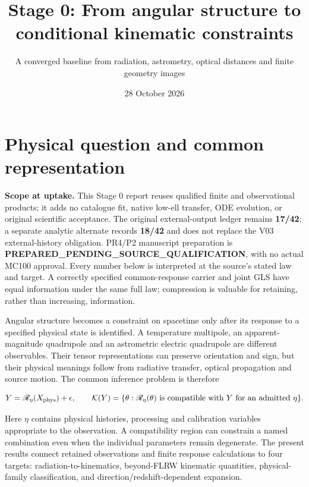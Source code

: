 \documentclass[
  10pt,
]{article}
\title{Stage 0: From angular structure to conditional kinematic
constraints}
\subtitle{A converged baseline from radiation, astrometry, optical
distances and finite geometry images}
\author{}
\date{28 October 2026}
\begin{document}
\maketitle

\hypertarget{physical-question-and-common-representation}{%
\section{Physical question and common
representation}\label{physical-question-and-common-representation}}

\textbf{Scope at uptake.} This Stage 0 report reuses qualified finite
and observational products; it adds no catalogue fit, native low-ell
transfer, ODE evolution, or original scientific acceptance. The original
external-output ledger remains \textbf{17/42}; a separate analytic
alternate records \textbf{18/42} and does not replace the V03
external-history obligation. PR4/P2 manuscript preparation is
\textbf{PREPARED\_PENDING\_SOURCE\_QUALIFICATION}, with no actual MC100
approval. Every number below is interpreted at the source's stated law
and target. A correctly specified common-response carrier and joint GLS
have equal information under the same full law; compression is valuable
for retaining, rather than increasing, information.

Angular structure becomes a constraint on spacetime only after its
response to a specified physical state is identified. A temperature
multipole, an apparent-magnitude quadrupole and an astrometric electric
quadrupole are different observables. Their tensor representations can
preserve orientation and sign, but their physical meanings follow from
radiative transfer, optical propagation and source motion. The common
inference problem is therefore

\[
Y=\mathscr R_\eta(X_{\rm phys})+\epsilon,
\qquad
\mathcal K(Y)=\{\theta:\mathscr R_\eta(\theta)\text{ is compatible with }Y
\text{ for an admitted }\eta\}.
\]

Here \(\eta\) contains physical histories, processing and calibration
variables appropriate to the observation. A compatibility region can
constrain a named combination even when the individual parameters remain
degenerate. The present results connect retained observations and finite
response calculations to four targets: radiation-to-kinematics,
beyond-FLRW kinematic quantities, physical-family classification, and
direction/redshift-dependent expansion.
\end{document}
